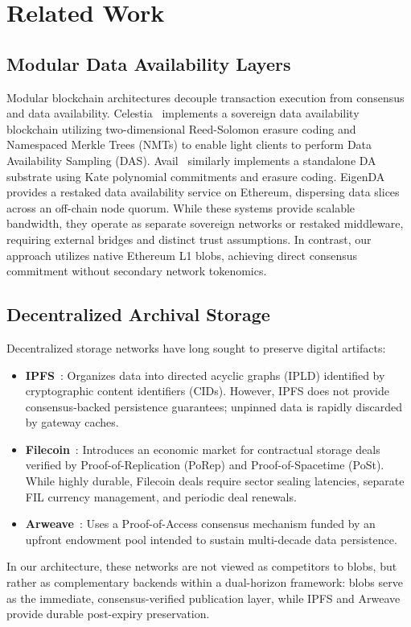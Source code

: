 \section{Related Work}
\label{sec:related_work}

\subsection{Modular Data Availability Layers}
Modular blockchain architectures decouple transaction execution from consensus and data availability. Celestia~\cite{al2019celestia} implements a sovereign data availability blockchain utilizing two-dimensional Reed-Solomon erasure coding and Namespaced Merkle Trees (NMTs) to enable light clients to perform Data Availability Sampling (DAS). Avail~\cite{wood2014ethereum} similarly implements a standalone DA substrate using Kate polynomial commitments and erasure coding. EigenDA~\cite{roughgarden2021eip1559} provides a restaked data availability service on Ethereum, dispersing data slices across an off-chain node quorum. While these systems provide scalable bandwidth, they operate as separate sovereign networks or restaked middleware, requiring external bridges and distinct trust assumptions. In contrast, our approach utilizes native Ethereum L1 blobs, achieving direct consensus commitment without secondary network tokenomics.

\subsection{Decentralized Archival Storage}
Decentralized storage networks have long sought to preserve digital artifacts:
\begin{itemize}
    \item \textbf{IPFS}~\cite{benet2014ipfs}: Organizes data into directed acyclic graphs (IPLD) identified by cryptographic content identifiers (CIDs). However, IPFS does not provide consensus-backed persistence guarantees; unpinned data is rapidly discarded by gateway caches.
    \item \textbf{Filecoin}~\cite{protocol2017filecoin}: Introduces an economic market for contractual storage deals verified by Proof-of-Replication (PoRep) and Proof-of-Spacetime (PoSt). While highly durable, Filecoin deals require sector sealing latencies, separate FIL currency management, and periodic deal renewals.
    \item \textbf{Arweave}~\cite{williams2019arweave}: Uses a Proof-of-Access consensus mechanism funded by an upfront endowment pool intended to sustain multi-decade data persistence.
\end{itemize}
In our architecture, these networks are not viewed as competitors to blobs, but rather as complementary backends within a dual-horizon framework: blobs serve as the immediate, consensus-verified publication layer, while IPFS and Arweave provide durable post-expiry preservation.

